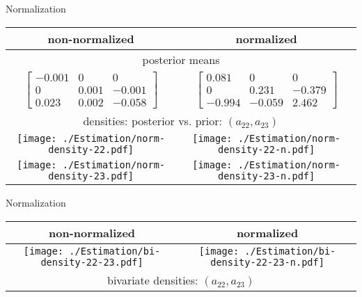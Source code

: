 \documentclass[notes,blackandwhite,mathsans,usenames,dvipsnames]{beamer}
\begin{document}
\begin{frame}{Normalization}

\begin{tabular}{cc}
\toprule
non-normalized  & normalized \\
\midrule
\multicolumn{2}{c}{posterior means}\\
$\begin{bmatrix}
-0.001& 0&  0\\
0& 0.001& -0.001\\
0.023& 0.002& -0.058
\end{bmatrix}$
&
$ \begin{bmatrix}
0.081&  0&  0\\
0&  0.231& -0.379\\
-0.994& -0.059&  2.462
\end{bmatrix}$\\[5ex]
\multicolumn{2}{c}{densities: posterior vs. prior: $(a_{22},a_{23})$}\\
\texttt{[image: ./Estimation/norm-density-22.pdf]}&
\texttt{[image: ./Estimation/norm-density-22-n.pdf]}\\

\texttt{[image: ./Estimation/norm-density-23.pdf]}&
\texttt{[image: ./Estimation/norm-density-23-n.pdf]}\\
\end{tabular}

\end{frame}




\begin{frame}{Normalization}

\begin{tabular}{cc}
\toprule
non-normalized  & normalized \\
\midrule
\texttt{[image: ./Estimation/bi-density-22-23.pdf]}&
\texttt{[image: ./Estimation/bi-density-22-23-n.pdf]}\\
\multicolumn{2}{c}{bivariate densities: $(a_{22},a_{23})$}
\end{tabular}

\end{frame}
\end{document}
